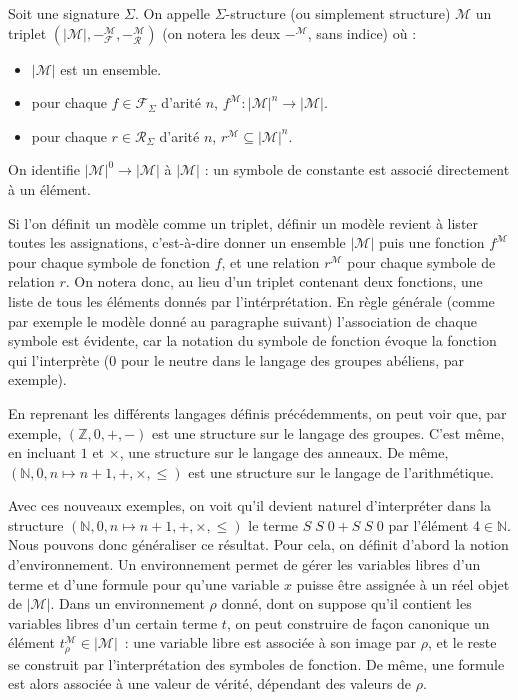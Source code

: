 \begin{definition}[Structure]
  Soit une signature $\Sigma$. On appelle $\Sigma$-structure (ou simplement
  structure) $\mathcal M$ un triplet
  $(|\mathcal M|,-^{\mathcal M}_\mathcal F,-^{\mathcal M}_\mathcal R)$
  (on notera les deux $-^{\mathcal M}$, sans indice) où :
  \begin{itemize}
  \item $|\mathcal M|$ est un ensemble.
  \item pour chaque $f\in \mathcal F_\Sigma$ d'arité $n$,
    $f^{\mathcal M} : |\mathcal M|^n \to |\mathcal M|$.
  \item pour chaque $r\in\mathcal R_\Sigma$ d'arité $n$,
    $r^{\mathcal M} \subseteq |\mathcal M|^n$.
  \end{itemize}

  On identifie $|\mathcal M|^0 \to |\mathcal M|$ à $|\mathcal M|$ : un symbole
  de constante est associé directement à un élément.
\end{definition}

\begin{remark}
  Si l'on définit un modèle comme un triplet, définir un modèle revient à lister
  toutes les assignations, c'est-à-dire donner un ensemble $|\mathcal M|$ puis
  une fonction $f^\mathcal M$ pour chaque symbole de fonction $f$, et
  une relation $r^\mathcal M$ pour chaque symbole de relation $r$. On
  notera donc, au lieu d'un triplet contenant deux fonctions, une liste de
  tous les éléments donnés par l'intérprétation. En règle générale (comme par
  exemple le modèle donné au paragraphe suivant) l'association de chaque symbole
  est évidente, car la notation du symbole de fonction évoque la fonction qui
  l'interprète ($0$ pour le neutre dans le langage des groupes abéliens, par
  exemple).
\end{remark}

\begin{example}
  En reprenant les différents langages définis précédemments, on peut voir que,
  par exemple, $(\mathbb Z,0,+,-)$ est une structure sur le langage des groupes.
  C'est même, en incluant $1$ et $\times$, une structure sur le langage des
  anneaux. De même, $(\mathbb N,0,n\mapsto n + 1,+,\times,\leq)$ est une
  structure sur le langage de l'arithmétique.
\end{example}

Avec ces nouveaux exemples, on voit qu'il devient naturel d'interpréter dans la
structure $(\mathbb N,0,n\mapsto n+1,+,\times,\leq)$ le terme
$S\;S\;0 + S\;S\;0$
par l'élément $4\in\mathbb N$. Nous pouvons donc généraliser ce résultat. Pour
cela, on définit d'abord la notion d'environnement. Un environnement permet de
gérer les variables libres d'un terme et d'une formule pour qu'une variable $x$
puisse être assignée à un réel objet de $|\mathcal M|$. Dans un environnement
$\rho$ donné, dont on suppose qu'il contient les variables libres d'un certain
terme $t$, on peut construire de façon canonique un élément
$t^\mathcal M_\rho \in |\mathcal M|$~: une variable libre est associée à son
image par $\rho$, et le reste se construit par l'interprétation des symboles
de fonction. De même, une formule est alors associée à une valeur de vérité,
dépendant des valeurs de $\rho$.


